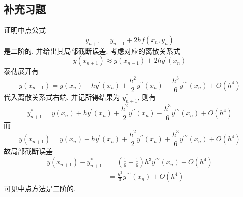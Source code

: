 


\subsection{补充习题}


  \begin{tcolorbox}[enhanced,colback=8,colframe=7,breakable,coltitle=green!25!black,title=2024]
证明中点公式
$$
y_{n+1}=y_{n-1}+2 h f\left(x_{n}, y_{n}\right)
$$
是二阶的, 并给出其局部截断误差.
\tcblower
 考虑对应的离散关系式
$$
y\left(x_{n+1}\right) \approx y\left(x_{n-1}\right)+2 h y^{\prime}\left(x_{n}\right)
$$
泰勒展开有
$$
y\left(x_{n-1}\right)=y\left(x_{n}\right)-h y^{\prime}\left(x_{n}\right)+\frac{h^{2}}{2} y^{\prime \prime}\left(x_{n}\right)-\frac{h^{3}}{6} y^{\prime \prime \prime}\left(x_{n}\right)+O\left(h^{4}\right)
$$
代入离散关系式右端, 并记所得结果为 $ y_{n+1}^{*} $, 则有
$$
y_{n+1}^{*}=y\left(x_{n}\right)+h y^{\prime}\left(x_{n}\right)+\frac{h^{2}}{2} y^{\prime \prime}\left(x_{n}\right)-\frac{h^{3}}{6} y^{\prime \prime \prime}\left(x_{n}\right)+O\left(h^{4}\right)
$$
而
$$
y\left(x_{n+1}\right)=y\left(x_{n}\right)+h y^{\prime}\left(x_{n}\right)+\frac{h^{2}}{2} y^{\prime \prime}\left(x_{n}\right)+\frac{h^{3}}{6} y^{\prime \prime \prime}\left(x_{n}\right)+O\left(h^{4}\right)
$$
故局部截断误差
$$
\begin{aligned}
y\left(x_{n+1}\right)-y_{n+1}^{*} & =\left(\frac{1}{6}+\frac{1}{6}\right) h^{3} y^{\prime \prime \prime}\left(x_{n}\right)+O\left(h^{4}\right) \\
& = \frac{h^{3}}{3} y^{\prime \prime \prime}\left(x_{n}\right)+O\left(h^{4}\right)
\end{aligned}
$$
可见中点方法是二阶的.

 \end{tcolorbox}


